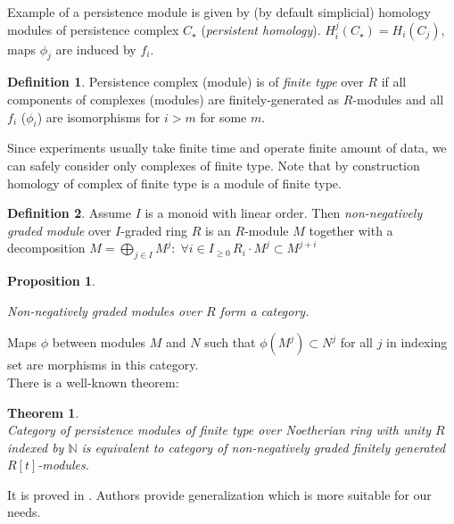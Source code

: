 \documentclass[a4paper, 12pt]{article}
\newtheorem{proposition}{Proposition}
\newtheorem{theorem}{Theorem}
\theoremstyle{definition}
\newtheorem{definition}{Definition}
\theoremstyle{remark}
\newcommand{\define}[1]{{\textit{#1}}}
\renewcommand{\geq}{\geqslant}
\begin{document}
Example of a persistence module is given by (by default simplicial) homology modules of persistence complex $C_{\star}$ (\define{persistent homology}). $H_i^j(C_{\star}) = H_i(C_{j})$, maps $\phi_j$ are induced by $f_i$.\\

\begin{definition}
  Persistence complex (module) is of \define{finite type} over $R$ if all components of complexes (modules) are finitely-generated as $R$-modules and all $f_i$ ($\phi_i$) are isomorphisms for $i > m$ for some $m$.
\end{definition}

Since experiments usually take finite time and operate finite amount of data, we can safely consider only complexes of finite type. Note that by construction homology of complex of finite type is a module of finite type.\\

\begin{definition}
  Assume $I$ is a monoid with linear order. Then \define{non-negatively graded module} over $I$-graded ring $R$ is an $R$-module $M$ together with a decomposition $M = \bigoplus_{j \in I} M^j:\; \forall i \in I_{\geq 0}\, R_i \cdot M^j \subset M^{j+i}$
\end{definition}

\begin{proposition} ~ \par
  Non-negatively graded modules over $R$ form a category.
\end{proposition}

Maps $\phi$ between modules $M$ and $N$ such that $\phi(M^j) \subset N^j$ for all $j$ in indexing set are morphisms in this category.\\

There is a well-known theorem:

\begin{theorem} {\cite[Theorem 3.1]{Zomorodian05}}\\
  Category of persistence modules of finite type over Noetherian ring with unity $R$ indexed by $\mathbb{N}$ is equivalent to category of non-negatively graded finitely generated $R[t]$-modules.
\end{theorem}

It is proved in {\cite{Corbet18}}. Authors provide generalization {\cite[Theorem 2]{Corbet18}} which is more suitable for our needs.\\
\end{document}
